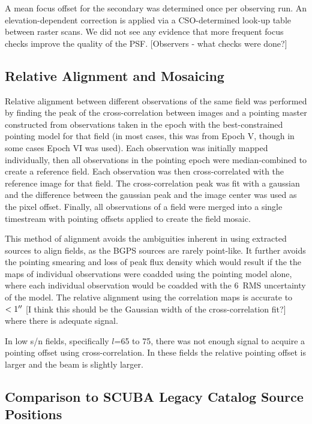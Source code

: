 \documentclass[12pt,preprint]{aastex}
\newcommand{\lon}{\ensuremath{l}}
\begin{document}
A mean focus offset for the secondary was determined once per observing
run.  An elevation-dependent correction is applied via a
CSO-determined look-up table between raster scans.  We did not see any
evidence that more frequent focus checks improve the quality of the
PSF. [Observers - what checks were done?]

\subsection{Relative Alignment and Mosaicing}

Relative alignment between different observations of the same field was
performed by finding the peak of the cross-correlation between images and a
pointing master constructed  from observations taken in the epoch with the
best-constrained pointing model for that field (in most cases, this was from
Epoch V, though in some cases Epoch VI was used).  Each observation was
initially mapped individually, then all observations in the pointing epoch were
median-combined to create a reference field.  Each observation was then
cross-correlated with the reference image for that field. The cross-correlation
peak was fit with a gaussian and the difference between the gaussian peak and
the image center was used as the pixel offset.  Finally, all observations of a
field were merged into a single timestream with pointing offsets applied to
create the field mosaic.

This method of alignment avoids the ambiguities inherent in using extracted
sources to align fields, as the BGPS sources are rarely point-like.  It further
avoids the pointing smearing and loss of peak flux density which would result
if the the maps of individual observations were coadded using the pointing
model alone, where each individual observation would be coadded with the
6\arcsec\ RMS uncertainty of the model.  The relative alignment using the
correlation maps is accurate to $<1\mbox{$^{\prime\prime}$}$ [I think this should be the
Gaussian width of the cross-correlation fit?] where there is adequate signal.

In low s/n fields, specifically \lon=65 to 75, there was not enough signal to
acquire a pointing offset using cross-correlation.  In these fields the
relative pointing offset is larger and the beam is slightly larger.

\subsection{Comparison to SCUBA Legacy Catalog Source Positions}
\label{sec:SCUBAPointingComparison}
\end{document}
